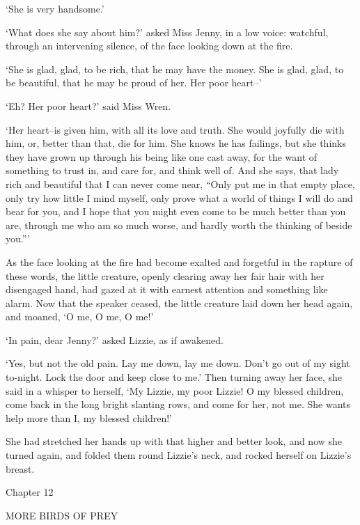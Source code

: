 ‘She is very handsome.’

‘What does she say about him?’ asked Miss Jenny, in a low voice:
watchful, through an intervening silence, of the face looking down at
the fire.

‘She is glad, glad, to be rich, that he may have the money. She is glad,
glad, to be beautiful, that he may be proud of her. Her poor heart--’

‘Eh? Her poor heart?’ said Miss Wren.

‘Her heart--is given him, with all its love and truth. She would
joyfully die with him, or, better than that, die for him. She knows he
has failings, but she thinks they have grown up through his being like
one cast away, for the want of something to trust in, and care for, and
think well of. And she says, that lady rich and beautiful that I can
never come near, “Only put me in that empty place, only try how little
I mind myself, only prove what a world of things I will do and bear for
you, and I hope that you might even come to be much better than you are,
through me who am so much worse, and hardly worth the thinking of beside
you.”’

As the face looking at the fire had become exalted and forgetful in the
rapture of these words, the little creature, openly clearing away
her fair hair with her disengaged hand, had gazed at it with earnest
attention and something like alarm. Now that the speaker ceased, the
little creature laid down her head again, and moaned, ‘O me, O me, O
me!’

‘In pain, dear Jenny?’ asked Lizzie, as if awakened.

‘Yes, but not the old pain. Lay me down, lay me down. Don’t go out of
my sight to-night. Lock the door and keep close to me.’ Then turning away
her face, she said in a whisper to herself, ‘My Lizzie, my poor Lizzie!
O my blessed children, come back in the long bright slanting rows, and
come for her, not me. She wants help more than I, my blessed children!’

She had stretched her hands up with that higher and better look, and
now she turned again, and folded them round Lizzie’s neck, and rocked
herself on Lizzie’s breast.



Chapter 12

MORE BIRDS OF PREY


